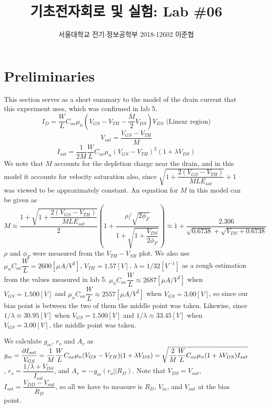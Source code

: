 \documentclass[a4paper, itemph]{oblivoir}
\theoremstyle{definition}
\begin{document}
\title{기초전자회로 및 실험: Lab \#06}
\author{서울대학교 전기$\cdot$정보공학부 2018-12602 이준협}
\maketitle

\section{Preliminaries}
This section serves as a short summary to the model of the drain current that this experiment uses, which was confirmed in lab 5.
\begin{equation}
    I_D = \dfrac{W}{L}C_{ox}\mu_n(V_{GS}-V_{TH}-\dfrac{M}{2}V_{DS})V_{DS}\text{ (Linear region)}
\end{equation}
\begin{equation}
     V_{sat}=\dfrac{V_{GS}-V_{TH}}{M}
\end{equation}
\begin{equation}
    I_{sat} = \dfrac{1}{2M}\dfrac{W}{L}C_{ox}\mu_n(V_{GS}-V_{TH})^2(1+\lambda V_{DS})
\end{equation}
We note that $M$ accounts for the depletion charge near the drain, and in this model it  accounts for velocity saturation also, since $\sqrt{1+\dfrac{2(V_{GS}-V_{TH})}{MLE_{sat}}}+1$ was viewed to be approximately constant. An equation for $M$ in this model can be given as
\[M\approx\dfrac{1+\sqrt{1+\dfrac{2(V_{GS}-V_{TH})}{MLE_{sat}}}}{2}(1+\dfrac{\rho/\sqrt{2\phi_F}}{1+\sqrt{1+\dfrac{V_{DS}}{2\phi_F}}})\approx 1+\dfrac{2.306}{\sqrt{0.6738}+\sqrt{V_{DS}+0.6738}}\]
$\rho$ and $\phi_F$ were measured from the $V_{TH}-V_{SB}$ plot. We also use $\mu_n C_{ox}\dfrac{W}{L}=2600[\mu A/V^2]$, $V_{TH}=1.57[V]$, $\lambda = 1/32[V^{-1}]$ as a rough estimation from the values measured in lab 5. $\mu_n C_{ox}\dfrac{W}{L}\approx 2687[\mu A/V^2]$ when $V_{GS}=1.500[V]$ and $\mu_n C_{ox}\dfrac{W}{L}\approx 2557[\mu A/V^2]$ when $V_{GS}=3.00[V]$, so since our bias point is between the two of them the middle point was taken. Likewise, since $1/\lambda\approx 30.95[V]$ when $V_{GS}=1.500[V]$ and $1/\lambda\approx 33.45[V]$ when $V_{GS}=3.00[V]$, the middle point was taken.

We calculate $g_m$, $r_o$ and $A_v$ as $g_m=\dfrac{\partial I_{sat}}{V_{GS}}=\dfrac{1}{M}\dfrac{W}{L}C_{ox}\mu_n(V_{GS}-V_{TH})(1+\lambda V_{DS})\\=\sqrt{\dfrac{2}{M}\dfrac{W}{L}C_{ox}\mu_n(1+\lambda V_{DS})I_{sat}}$, $r_o=\dfrac{1/\lambda+V_{DS}}{I_{sat}}$, and $A_v=-g_m(r_o||R_D)$. Note that $V_{DS}=V_{out}$, $I_{sat}=\dfrac{V_{DD}-V_{out}}{R_D}$, so all we have to measure is $R_D$, $V_{in}$, and $V_{out}$ at the bias point.
\end{document}
